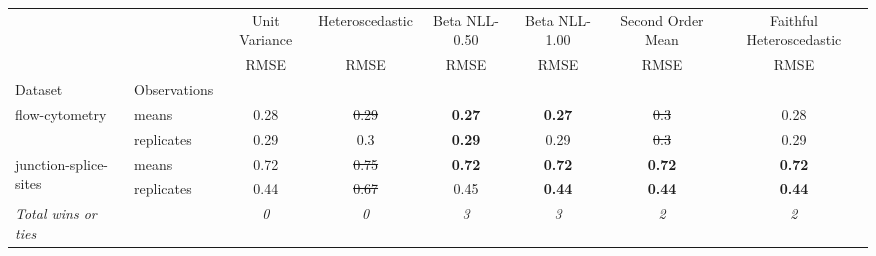 \begin{tabular}{ll|c|c|c|c|c|c}
\toprule
{} & {} & {Unit Variance} & {Heteroscedastic} & {Beta NLL-0.50} & {Beta NLL-1.00} & {Second Order Mean} & {Faithful Heteroscedastic} \\
{} & {} & {RMSE} & {RMSE} & {RMSE} & {RMSE} & {RMSE} & {RMSE} \\
{Dataset} & {Observations} & {} & {} & {} & {} & {} & {} \\
\midrule
\multirow[c]{2}{*}{flow-cytometry} & means & 0.28 & \sout{0.29} & \textbf{0.27} & \textbf{0.27} & \sout{0.3} & 0.28 \\
 & replicates & 0.29 & 0.3 & \textbf{0.29} & 0.29 & \sout{0.3} & 0.29 \\
\multirow[c]{2}{*}{junction-splice-sites} & means & 0.72 & \sout{0.75} & \textbf{0.72} & \textbf{0.72} & \textbf{0.72} & \textbf{0.72} \\
 & replicates & 0.44 & \sout{0.67} & 0.45 & \textbf{0.44} & \textbf{0.44} & \textbf{0.44} \\
\textit{{Total wins or ties}} &  & \textit{0} & \textit{0} & \textit{3} & \textit{3} & \textit{2} & \textit{2} \\
\bottomrule
\end{tabular}
